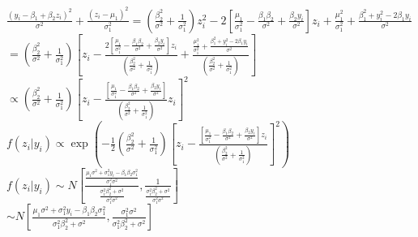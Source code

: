 \documentclass{article}\usepackage[]{graphicx}\usepackage[]{color}
\begin{document}
$\frac{(y_{i}-\beta_{1}+\beta_{2} z_{i})^{2}}{\sigma^{2}}+\frac{(z_{i}-\mu_{1})^{2}}{\sigma^{2}_{1}}=\left(\frac{\beta_{2}^{2}}{\sigma^{2}}+\frac{1}{\sigma^{2}_{1}}\right)z_{i}^{2}-2\left[\frac{\mu_{1}}{\sigma^{2}_{1}}-\frac{\beta_{1}\beta_{2}}{\sigma^{2}}+\frac{\beta_{2}y_{i}}{\sigma^{2}}\right]z_{i}+\frac{\mu_{1}^{2}}{\sigma^{2}_{1}}+\frac{\beta_{1}^{2}+y_{i}^{2}-2\beta_{1}y_{i}}{\sigma^{2}}$\vspace{5mm}\\

$=\left(\frac{\beta_{2}^{2}}{\sigma^{2}}+\frac{1}{\sigma^{2}_{1}}\right)\left[z_{i}-\frac{2\left[\frac{\mu_{1}}{\sigma^{2}_{1}}-\frac{\beta_{1}\beta_{2}}{\sigma^{2}}+\frac{\beta_{2}y_{i}}{\sigma^{2}}\right]z_{i}}{\left(\frac{\beta_{2}^{2}}{\sigma^{2}}+\frac{1}{\sigma^{2}_{1}}\right)}+\frac{\frac{\mu_{1}^{2}}{\sigma^{2}_{1}}+\frac{\beta_{1}^{2}+y_{i}^{2}-2\beta_{1}y_{i}}{\sigma^{2}}}{\left(\frac{\beta_{2}^{2}}{\sigma^{2}}+\frac{1}{\sigma^{2}_{1}}\right)}  \right]$\vspace{5mm}\\

$\propto  \left(\frac{\beta_{2}^{2}}{\sigma^{2}}+\frac{1}{\sigma^{2}_{1}}\right)\left[z_{i}-\frac{\left[\frac{\mu_{1}}{\sigma^{2}_{1}}-\frac{\beta_{1}\beta_{2}}{\sigma^{2}}+\frac{\beta_{2}y_{i}}{\sigma^{2}}\right]{}}{\left(\frac{\beta_{2}^{2}}{\sigma^{2}}+\frac{1}{\sigma^{2}_{1}}\right)} z_{i} \right]^{2}$\vspace{5mm}\\


$f(z_{i}|y_{i})\propto \exp\left(-\frac{1}{2}\left(\frac{\beta_{2}^{2}}{\sigma^{2}}+\frac{1}{\sigma^{2}_{1}}\right)\left[z_{i}-\frac{\left[\frac{\mu_{1}}{\sigma^{2}_{1}}-\frac{\beta_{1}\beta_{2}}{\sigma^{2}}+\frac{\beta_{2}y_{i}}{\sigma^{2}}\right]z_{i}}{\left(\frac{\beta_{2}^{2}}{\sigma^{2}}+\frac{1}{\sigma^{2}_{1}}\right)}  \right]^{2}\right)$\vspace{5mm}\\


$f(z_{i}|y_{i})  \sim  N\left[\frac{\frac{\mu_{1}\sigma^{2}+\sigma_{1}^{2}y_{i}-\beta_{1}\beta_{2}\sigma_{1}^{2}}{\sigma^{2}_{1}\sigma^{2}}}{\frac{\sigma^{2}_{1}\beta_{2}^{2}+\sigma^{2}}{\sigma^{2}_{1}\sigma^{2}}},\frac{1}{\frac{\sigma^{2}_{1}\beta_{2}^{2}+\sigma^{2}}{\sigma^{2}_{1}\sigma^{2}}}  \right]   $\vspace{5mm}\\

$\sim N \left[\frac{\mu_{1}\sigma^{2}+\sigma_{1}^{2}y_{i}-\beta_{1}\beta_{2}\sigma_{1}^{2}}{\sigma^{2}_{1}\beta_{2}^{2}+\sigma^{2}},\frac{\sigma^{2}_{1}\sigma^{2}}{\sigma^{2}_{1}\beta_{2}^{2}+\sigma^{2}}  \right]$\vspace{5mm}\\
\end{document}
